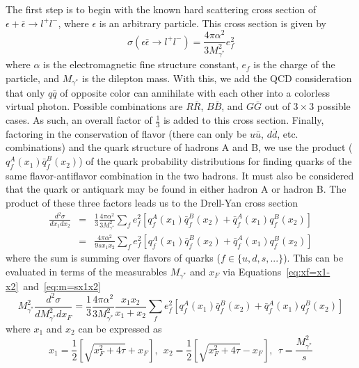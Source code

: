 The first step is to begin with the known hard scattering cross section of $\epsilon + \bar{\epsilon} \rightarrow l^+ l^-$, where $\epsilon$ is an arbitrary particle. This cross section\cite{Halzen:1984mc} is given by
\begin{equation}
\sigma(\epsilon\bar{\epsilon}\rightarrow l^+l^-) = \frac{4 \pi \alpha^2}{3M_{\gamma^*}^2} e_f^2
\label{eq:annihilation-cross}
\end{equation}
where $\alpha$ is the electromagnetic fine structure constant, $e_f$ is the charge of the particle, and $M_{\gamma^*}$ is the dilepton mass. With this, we add the QCD consideration that only $q\bar{q}$ of opposite color can annihilate with each other into a colorless virtual photon. Possible combinations are $R\bar{R}$, $B\bar{B}$, and $G\bar{G}$ out of $3\times 3$ possible cases. As such, an overall factor of $\frac{1}{3}$ is added to this cross section. Finally, factoring in the conservation of flavor (there can only be $u\bar{u}$, $d\bar{d}$, etc. combinations) and the quark structure of hadrons A and B,  we use the product ($q_f^A(x_1)\bar{q}_{f}^B(x_2)$) of the quark probability distributions for finding quarks of the same flavor-antiflavor combination in the two hadrons. It must also be considered that the quark or antiquark may be found in either hadron A or hadron B. The product of these three factors leads us to the Drell-Yan cross section\cite{Drell:1970wh}
\begin{eqnarray}
\frac{d^2\sigma}{dx_1dx_2}&=&\frac{1}{3}\frac{4\pi\alpha^2}{3M_{\gamma^*}^2}
\sum_{f}e_f^2[q_f^A(x_1)\bar{q}_f^B(x_2)+
\bar{q}_f^A(x_1)q_f^B(x_2)]\\
&=&\frac{4\pi\alpha^2}{9 s x_1 x_2}
\sum_{f}e_f^2[q_f^A(x_1)\bar{q}_f^B(x_2)+
\bar{q}_f^A(x_1)q_f^B(x_2)]
\label{eq:DY-cross}
\end{eqnarray}
where the sum is summing over flavors of quarks ($f\in\{u,d,s,...\}$). This can be evaluated in terms of the measurables $M_{\gamma^*}$ and $x_F$ via Equations~\ref{eq:xf=x1-x2}~and~\ref{eq:m=sx1x2}
\begin{equation}
M_{\gamma^*}^2 \frac{d^2\sigma}{dM_{\gamma^*}^2 dx_F} = 
\frac{1}{3}\frac{4\pi\alpha^2}{3M_{\gamma^*}^2}
\frac{x_1 x_2}{x_1 + x_2}
\sum_{f}e_f^2[q_f^A(x_1)\bar{q}_f^B(x_2)+
\bar{q}_f^A(x_1)q_f^B(x_2)]
\label{eq:dy-cs-observe}
\end{equation}
where $x_1$ and $x_2$ can be expressed as
\begin{equation}
x_1 = \frac{1}{2}\left[\sqrt{x_F^2 + 4\tau} + x_F\right],\ \  
x_2 = \frac{1}{2}\left[\sqrt{x_F^2 + 4\tau} - x_F\right],\ \ 
\tau = \frac{M_{\gamma^*}^2}{s} \label{eq:x1-x2-tau}
\end{equation}
